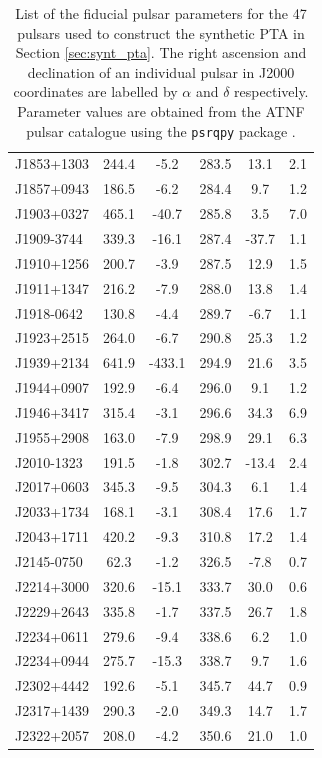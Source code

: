 \documentclass[fleqn,usenatbib,useAMS]{mnras}
\begin{document}
\begin{table}
\begin{tabular}{lccccc}
	J1853+1303 & 244.4 &       -5.2 & 283.5 &   13.1 &   2.1 \\
	J1857+0943 & 186.5 &       -6.2 & 284.4 &    9.7 &   1.2 \\
	J1903+0327 & 465.1 &      -40.7 & 285.8 &    3.5 &   7.0 \\
	J1909-3744 & 339.3 &      -16.1 & 287.4 &  -37.7 &   1.1 \\
	J1910+1256 & 200.7 &       -3.9 & 287.5 &   12.9 &   1.5 \\
	J1911+1347 & 216.2 &       -7.9 & 288.0 &   13.8 &   1.4 \\
	J1918-0642 & 130.8 &       -4.4 & 289.7 &   -6.7 &   1.1 \\
	J1923+2515 & 264.0 &       -6.7 & 290.8 &   25.3 &   1.2 \\
	J1939+2134 & 641.9 &     -433.1 & 294.9 &   21.6 &   3.5 \\
	J1944+0907 & 192.9 &       -6.4 & 296.0 &    9.1 &   1.2 \\
	J1946+3417 & 315.4 &       -3.1 & 296.6 &   34.3 &   6.9 \\
	J1955+2908 & 163.0 &       -7.9 & 298.9 &   29.1 &   6.3 \\
	J2010-1323 & 191.5 &       -1.8 & 302.7 &  -13.4 &   2.4 \\
	J2017+0603 & 345.3 &       -9.5 & 304.3 &    6.1 &   1.4 \\
	J2033+1734 & 168.1 &       -3.1 & 308.4 &   17.6 &   1.7 \\
	J2043+1711 & 420.2 &       -9.3 & 310.8 &   17.2 &   1.4 \\
	J2145-0750 &  62.3 &       -1.2 & 326.5 &   -7.8 &   0.7 \\
	J2214+3000 & 320.6 &      -15.1 & 333.7 &   30.0 &   0.6 \\
	J2229+2643 & 335.8 &       -1.7 & 337.5 &   26.7 &   1.8 \\
	J2234+0611 & 279.6 &       -9.4 & 338.6 &    6.2 &   1.0 \\
	J2234+0944 & 275.7 &      -15.3 & 338.7 &    9.7 &   1.6 \\
	J2302+4442 & 192.6 &       -5.1 & 345.7 &   44.7 &   0.9 \\
	J2317+1439 & 290.3 &       -2.0 & 349.3 &   14.7 &   1.7 \\
	J2322+2057 & 208.0 &       -4.2 & 350.6 &   21.0 &   1.0 \\
	\bottomrule
\end{tabular}
\caption{List of the fiducial pulsar parameters for the 47 pulsars used to construct the synthetic PTA in Section \ref{sec:synt_pta}. The right ascension and declination of an individual pulsar in J2000 coordinates are labelled by $\alpha$ and $\delta$ respectively. Parameter values are obtained from the ATNF pulsar catalogue \citep{Manchester2005} using the \texttt{psrqpy} package \citep{psrqpy}.}
\label{tab:pulsar_values}
\end{table}
\end{document}
